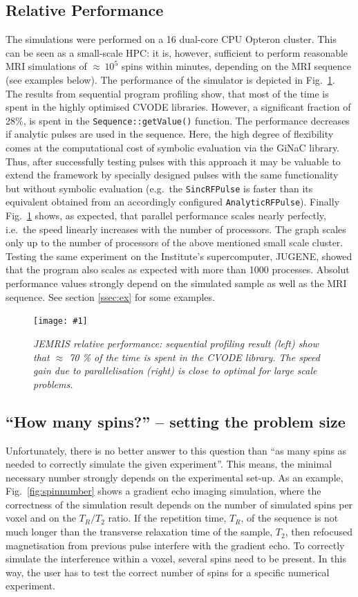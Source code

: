 \documentclass[journal,onecolumn,12pt]{IEEEtran}
\newcommand{\epsfig}[5]{
 \begin{figure}[#4!]
   \begin{center}
    \texttt{[image: \#1]}
    \caption{{\sl #2}\label{#3}}
   \end{center}
 \end{figure}}
\begin{document}
\subsection{Relative Performance}
The simulations were performed on a 16 dual-core CPU Opteron cluster. This can be seen as a small-scale HPC: it is,
however, sufficient to perform reasonable MRI simulations of $\approx\,10^5$ spins within minutes, depending on the MRI
sequence (see examples below).  The performance of the simulator is depicted in Fig.~\ref{fig:performance}. The results
from sequential program profiling show, that most of the time is spent in the highly optimised CVODE libraries.
However, a significant fraction of 28\%, is spent in the \verb+Sequence::getValue()+ function. The performance decreases
if analytic pulses are used in the sequence. Here, the high degree of flexibility comes at the computational cost of
symbolic evaluation via the GiNaC library.  Thus, after successfully testing pulses with this approach it may be
valuable to extend the framework by specially designed pulses with the same functionality but without symbolic
evaluation (e.g.~the \verb+SincRFPulse+ is faster than its equivalent obtained from an accordingly configured
\verb+AnalyticRFPulse+). Finally Fig.~\ref{fig:performance} shows, as expected, that parallel performance scales nearly
perfectly, i.e.~the speed linearly increases with the number of processors. The graph scales only up to the number of
processors of the above mentioned small scale cluster. Testing the same experiment on the Institute's
supercomputer, JUGENE, showed that the program also scales as expected with more than 1000 processes. Absolut performance
values strongly depend on the simulated sample as well as the MRI sequence. See section \ref{ssec:ex} for some examples.

\epsfig{fig/performance.eps}{JEMRIS relative performance: sequential profiling result (left) show that $\approx$ 70 \%
  of the time is spent in the CVODE library. The speed gain due to parallelisation (right) is close to optimal for large
  scale problems.}{fig:performance}{htbp}{1.0}



\subsection{``How many spins?'' -- setting the problem size}

Unfortunately, there is no better answer to this question than ``as many spins as needed to correctly simulate the given
experiment''. This means, the minimal necessary number strongly depends on the experimental set-up. As an example,
Fig.~\ref{fig:spinnumber} shows a gradient echo imaging simulation, where the correctness of the simulation result
depends on the number of simulated spins per voxel and on the $T_R/T_2$ ratio. If the repetition time, $T_R$, of the
sequence is not much longer than the transverse relaxation time of the sample, $T_2$, then refocused magnetisation from
previous pulse interfere with the gradient echo. To correctly simulate the interference within a voxel, several spins
need to be present. In this way, the user has to test the correct number of spins for a specific numerical experiment.
\end{document}
